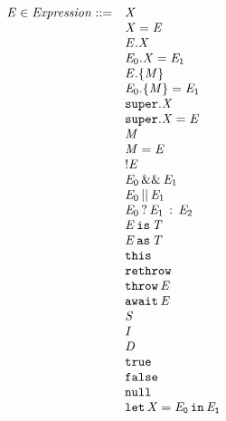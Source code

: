\documentclass{article}
\begin{document}

\newcommand{\ThisExpression}{\tt{this}}
\newcommand{\Rethrow}{\tt{rethrow}}
\newcommand{\Throw}[1]{\tt{throw}\,#1}


\newcommand{\AwaitExpression}[1]{\tt{await\,#1}}


\newcommand{\StringLiteral}[1]{#1}
\newcommand{\IntLiteral}[1]{#1}
\newcommand{\DoubleLiteral}[1]{#1}
\newcommand{\BoolLiteral}[1]{#1}
\newcommand{\NullLiteral}{\tt{null}}
\newcommand{\Let}[3]{\tt{let}\,#1=#2\,\tt{in}\,#3}


\[
\begin{array}{rl}
  \expressionmeta \in \mathit{Expression} ::=
  & \VariableGet{\variablemeta} \\
  & \VariableSet{\variablemeta}{\expressionmeta} \\
  & \PropertyGet{\expressionmeta}{\idmeta} \\
  & \PropertySet{\expressionmeta_0}{\idmeta}{\expressionmeta_1} \\
  & \DirectPropertyGet{\expressionmeta}{\membermeta} \\
  & \DirectPropertySet{\expressionmeta_0}{\membermeta}{\expressionmeta_1} \\
  & \SuperPropertyGet{\idmeta} \\
  & \SuperPropertySet{\idmeta}{\expressionmeta} \\
  & \StaticGet{\membermeta} \\
  & \StaticSet{\membermeta}{\expressionmeta} \\
  & \Not{\expressionmeta} \\
  & \AndExpression{\expressionmeta_0}{\expressionmeta_1} \\
  & \OrExpression{\expressionmeta_0}{\expressionmeta_1} \\
  & \ConditionalExpression{\expressionmeta_0}{\expressionmeta_1}{\expressionmeta_2} \\
  & \IsExpression{\expressionmeta}{\typemeta} \\
  & \AsExpression{\expressionmeta}{\typemeta} \\
  & \ThisExpression \\
  & \Rethrow \\
  & \Throw{\expressionmeta} \\
  & \AwaitExpression{\expressionmeta} \\
  & \StringLiteral{\stringmeta} \\
  & \IntLiteral{\integermeta} \\
  & \DoubleLiteral{\doublemeta} \\
  & \BoolLiteral{\tt{true}} \\
  & \BoolLiteral{\tt{false}} \\
  & \NullLiteral \\
  & \Let{\variablemeta}{\expressionmeta_0}{\expressionmeta_1} \\
\end{array}  
\]
\end{document}
